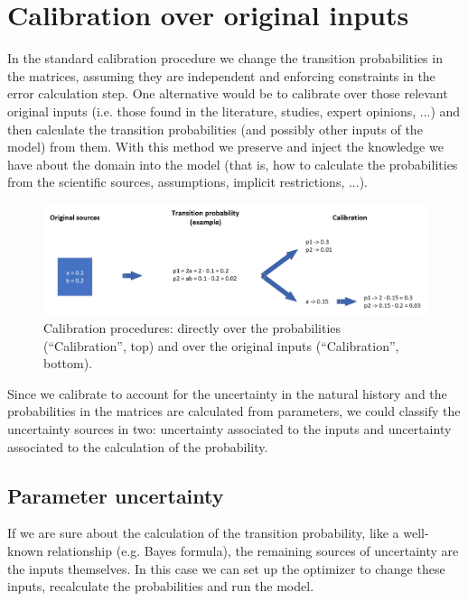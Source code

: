 \section{Calibration over original inputs}

In the standard calibration procedure we change the transition probabilities in the matrices, assuming they are independent and enforcing constraints in the error calculation step. One alternative would be to calibrate over those relevant original inputs (i.e. those found in the literature, studies, expert opinions, ...) and then calculate the transition probabilities (and possibly other inputs of the model) from them. With this method we preserve and inject the knowledge we have about the domain into the model (that is, how to calculate the probabilities from the scientific sources, assumptions, implicit restrictions, ...).

\begin{figure}[h]
	\centering
	\includegraphics[width=\textwidth]{figures/calibration_inputs}
	\decoRule
	\caption[Calibration over inputs]{Calibration procedures: directly over the probabilities (``Calibration'', top) and over the original inputs (``Calibration'', bottom).}
	\label{fig:calibration_inputs}
\end{figure}

Since we calibrate to account for the uncertainty in the natural history and the probabilities in the matrices are calculated from parameters, we could classify the uncertainty sources in two: uncertainty associated to the inputs and uncertainty associated to the calculation of the probability.

\subsection{Parameter uncertainty}
If we are sure about the calculation of the transition probability, like a well-known relationship (e.g. Bayes formula), the remaining sources of uncertainty are the inputs themselves. In this case we can set up the optimizer to change these inputs, recalculate the probabilities and run the model.

